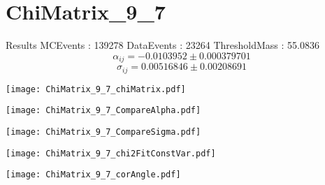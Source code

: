 \documentclass[a4paper,12pt]{article}
\begin{document}
\section{ChiMatrix\_9\_7}
\begin{minipage}{0.49\linewidth} Results \newline
MCEvents : 139278\newline
DataEvents : 23264 \newline
ThresholdMass : 55.0836\\
$$\alpha_{ij} = -0.0103952\pm 0.000379701$$
$$\sigma_{ij} = 0.00516846\pm 0.00208691$$
\end{minipage}\hfill
\begin{minipage}{0.49\linewidth} 
\texttt{[image: ChiMatrix\_9\_7\_chiMatrix.pdf]}\\
\end{minipage}
\hfill
\begin{minipage}{0.49\linewidth} 
\texttt{[image: ChiMatrix\_9\_7\_CompareAlpha.pdf]}\\
\end{minipage}
\hfill
\begin{minipage}{0.49\linewidth} 
\texttt{[image: ChiMatrix\_9\_7\_CompareSigma.pdf]}\\
\end{minipage}
\begin{minipage}{0.49\linewidth} 
\texttt{[image: ChiMatrix\_9\_7\_chi2FitConstVar.pdf]}\\
\end{minipage}
\hfill
\begin{minipage}{0.49\linewidth} 
\texttt{[image: ChiMatrix\_9\_7\_corAngle.pdf]}\\
\end{minipage}
\end{document}
